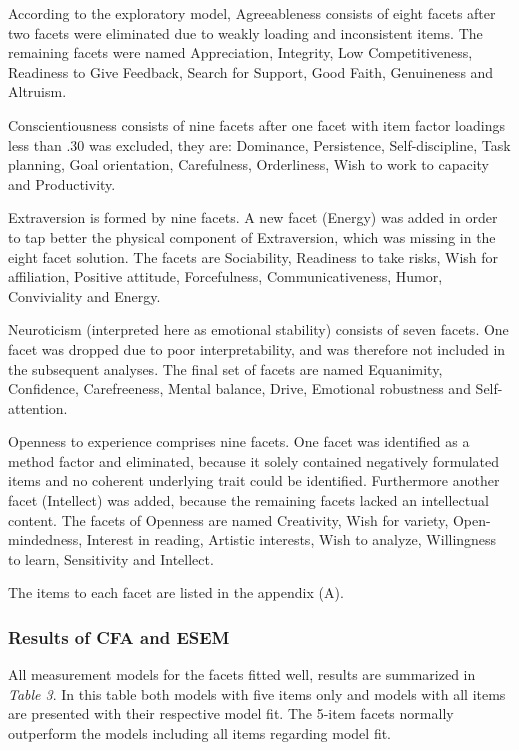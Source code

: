\documentclass[,man,floatsintext]{apa6}
\begin{document}
\vspace{5mm}

According to the exploratory model, Agreeableness consists of eight
facets after two facets were eliminated due to weakly loading and
inconsistent items. The remaining facets were named Appreciation,
Integrity, Low Competitiveness, Readiness to Give Feedback, Search for
Support, Good Faith, Genuineness and Altruism.

Conscientiousness consists of nine facets after one facet with item
factor loadings less than .30 was excluded, they are: Dominance,
Persistence, Self-discipline, Task planning, Goal orientation,
Carefulness, Orderliness, Wish to work to capacity and Productivity.

Extraversion is formed by nine facets. A new facet (Energy) was added in
order to tap better the physical component of Extraversion, which was
missing in the eight facet solution. The facets are Sociability,
Readiness to take risks, Wish for affiliation, Positive attitude,
Forcefulness, Communicativeness, Humor, Conviviality and Energy.

Neuroticism (interpreted here as emotional stability) consists of seven
facets. One facet was dropped due to poor interpretability, and was
therefore not included in the subsequent analyses. The final set of
facets are named Equanimity, Confidence, Carefreeness, Mental balance,
Drive, Emotional robustness and Self-attention.

Openness to experience comprises nine facets. One facet was identified
as a method factor and eliminated, because it solely contained
negatively formulated items and no coherent underlying trait could be
identified. Furthermore another facet (Intellect) was added, because the
remaining facets lacked an intellectual content. The facets of Openness
are named Creativity, Wish for variety, Open-mindedness, Interest in
reading, Artistic interests, Wish to analyze, Willingness to learn,
Sensitivity and Intellect.

The items to each facet are listed in the appendix (A).

\subsubsection{Results of CFA and ESEM}\label{results-of-cfa-and-esem}

All measurement models for the facets fitted well, results are
summarized in \emph{Table 3}. In this table both models with five items
only and models with all items are presented with their respective model
fit. The 5-item facets normally outperform the models including all
items regarding model fit.
\end{document}
